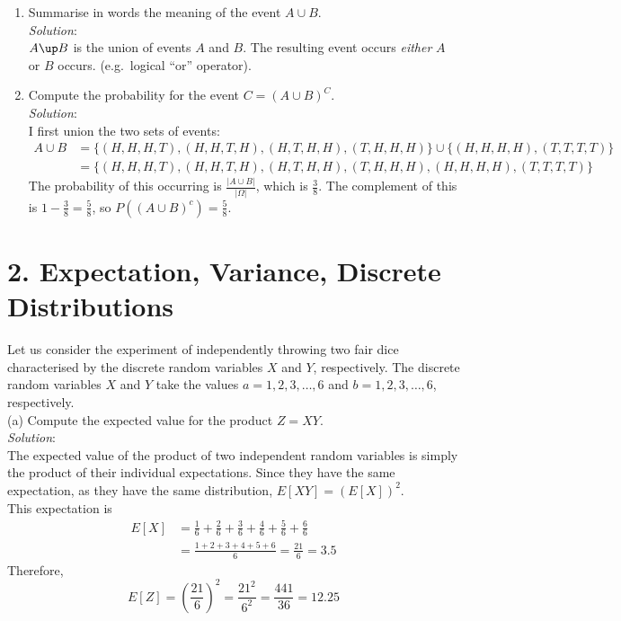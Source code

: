 \documentclass[
]{article}
\begin{document}
\begin{enumerate}
\def\labelenumi{(\alph{enumi})}
\setcounter{enumi}{2}
\item
  Summarise in words the meaning of the event \(A\cup B\).\\
  \emph{Solution}:\\
  \(A\up B\) is the union of events \(A\) and \(B\). The resulting event
  occurs \emph{either} \(A\) or \(B\) occurs. (e.g.~logical ``or''
  operator).
\item
  Compute the probability for the event \(C=(A\cup B)^C\).\\
  \emph{Solution}:\\
  I first union the two sets of events:\\
  \[
  \begin{aligned}
  A\cup B&=\{(H,H,H,T), (H,H,T,H), (H,T,H,H), (T,H,H,H)\}\cup\{(H,H,H,H), (T,T,T,T)\} \\
  &=\{(H,H,H,T), (H,H,T,H), (H,T,H,H), (T,H,H,H), (H,H,H,H), (T,T,T,T)\}
  \end{aligned}
  \] The probability of this occurring is
  \(\frac{|A\cup B|}{|\Omega|}\), which is \(\frac{3}{8}\). The
  complement of this is \(1-\frac{3}{8}=\frac{5}{8}\), so
  \(P((A\cup B)^c)=\frac{5}{8}\).
\end{enumerate}

\hypertarget{expectation-variance-discrete-distributions}{%
\section{2. Expectation, Variance, Discrete
Distributions}\label{expectation-variance-discrete-distributions}}

Let us consider the experiment of independently throwing two fair dice
characterised by the discrete random variables \(X\) and \(Y\),
respectively. The discrete random variables \(X\) and \(Y\) take the
values \(a=1,2,3,\dots,6\) and \(b=1,2,3,\dots,6\), respectively.\\
(a) Compute the expected value for the product \(Z=XY\).\\
\emph{Solution}:\\
The expected value of the product of two independent random variables is
simply the product of their individual expectations. Since they have the
same expectation, as they have the same distribution,
\(E[XY]=(E[X])^2\).\\
This expectation is \[
\begin{aligned}
E[X]&=\frac{1}{6}+\frac{2}{6}+\frac{3}{6}+\frac{4}{6}+\frac{5}{6}+\frac{6}{6} \\
&=\frac{1+2+3+4+5+6}{6}=\frac{21}{6}=3.5
\end{aligned}
\] Therefore, \[
E[Z]=\left(\frac{21}{6}\right)^2=\frac{21^2}{6^2}=\frac{441}{36}=12.25
\]
\end{document}
